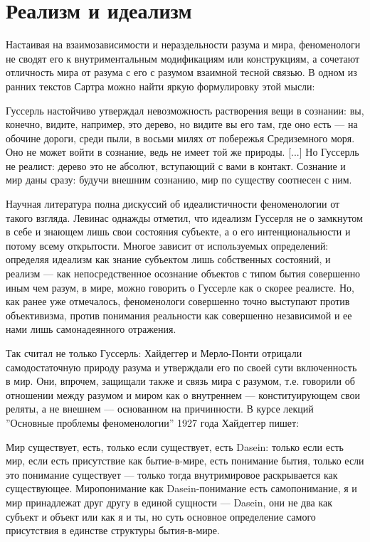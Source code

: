 \documentclass[11pt]{book}
\begin{document}
\section{Реализм и идеализм}

Настаивая на взаимозависимости и нераздельности разума и мира, феноменологи не сводят его к внутриментальным модификациям или конструкциям, а сочетают отличность мира от разума с его с разумом взаимной тесной связью. В одном из ранних текстов Сартра можно найти яркую формулировку этой мысли:

\smallskip
{}\relax
{}\relax

Гуссерль настойчиво утверждал невозможность растворения вещи в сознании: вы, конечно, видите, например, это дерево, но видите вы его там, где оно есть --- на обочине дороги, среди пыли, в восьми милях от побережья Средиземного моря. Оно не может войти в сознание, ведь не имеет той же природы. [...] Но Гуссерль не реалист: дерево это не абсолют, вступающий с вами в контакт. Сознание и мир даны сразу: будучи внешним сознанию, мир по существу соотнесен с ним.

\relax
{}\relax
\smallskip

Научная литература полна дискуссий об идеалистичности феноменологии от такого взгляда. Левинас однажды отметил, что идеализм Гуссерля не о замкнутом в себе и знающем лишь свои состояния субъекте, а о его интенциональности и потому всему открытости. Многое зависит от используемых определений: определяя идеализм как знание субъектом лишь собственных состояний, и реализм --- как непосредственное осознание объектов с типом бытия совершенно иным чем разум, в мире, можно говорить о Гуссерле как о скорее реалисте. Но, как ранее уже отмечалось, феноменологи совершенно точно выступают против объективизма, против понимания реальности как совершенно независимой и ее нами лишь самонадеянного отражения.

Так считал не только Гуссерль: Хайдеггер и Мерло-Понти отрицали самодостаточную природу разума и утверждали его по своей сути включенность в мир. Они, впрочем, защищали также и связь мира с разумом, т.е. говорили об отношении между разумом и миром как о внутреннем --- конституирующем свои реляты, а не внешнем --- основанном на причинности. В курсе лекций ''Основные проблемы феноменологии'' 1927 года Хайдеггер пишет:

\smallskip
{}\relax
{}\relax

Мир существует, есть, только если существует, есть Dasein: только если есть мир, если есть присутствие как бытие-в-мире, есть понимание бытия, только если это понимание существует --- только тогда внутримировое раскрывается как существующее. Миропонимание как Dasein-понимание есть самопонимание, я и мир принадлежат друг другу в единой сущности --- Dasein, они не два как субъект и объект или как я и ты, но суть основное определение самого присутствия в единстве структуры бытия-в-мире.
\end{document}

